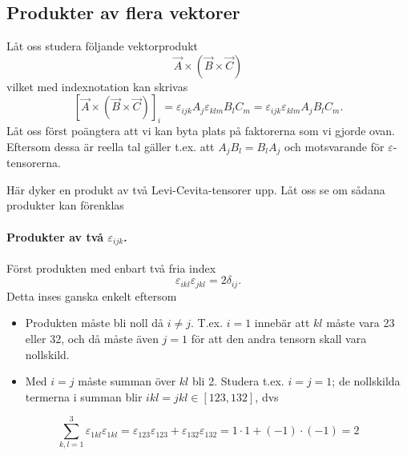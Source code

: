 \documentclass[%
oneside,                 %
final,                   %
10pt]{article}
\begin{document}
\subsection{Produkter av flera vektorer}

Låt oss studera följande vektorprodukt
\begin{equation}
  \vec{A} \times \left( \vec{B} \times \vec{C} \right)
\end{equation}
vilket med indexnotation kan skrivas
\begin{equation}
  \label{eq:ABC}
  \left[ \vec{A} \times \left( \vec{B} \times \vec{C} \right) \right]_i =
  \varepsilon_{ijk} A_j \varepsilon_{klm} B_l C_m = \varepsilon_{ijk} \varepsilon_{klm} A_j B_l C_m.
\end{equation}
Låt oss först poängtera att vi kan byta plats på faktorerna som vi gjorde ovan. Eftersom dessa är reella tal gäller t.ex. att $A_j B_l = B_l A_j$ och motsvarande för $\varepsilon$-tensorerna.

Här dyker en produkt av två Levi-Cevita-tensorer upp. Låt oss se om sådana produkter kan förenklas

\paragraph{Produkter av två $\varepsilon_{ijk}$.}
Först produkten med enbart två fria index
\begin{equation}
  \varepsilon_{ikl} \varepsilon_{jkl} = 2 \delta_{ij}.
\end{equation}
Detta inses ganska enkelt eftersom 
\begin{itemize}
\item Produkten måste bli noll då $i \neq j$. T.ex. $i=1$ innebär att $kl$ måste vara 23 eller 32, och då måste även $j=1$ för att den andra tensorn skall vara nollskild.

\item Med $i=j$ måste summan över $kl$ bli 2. Studera t.ex. $i=j=1$; de nollskilda termerna i summan blir $ikl=jkl \in [123,132]$, dvs
\end{itemize}

\noindent
\begin{equation}
	\sum_{k,l=1}^3 \varepsilon_{1kl} \varepsilon_{1kl} = \varepsilon_{123} \varepsilon_{123} + \varepsilon_{132} \varepsilon_{132} = 1 \cdot 1 + (-1) \cdot (-1) = 2
\end{equation}


\vspace{3mm}
\end{document}
